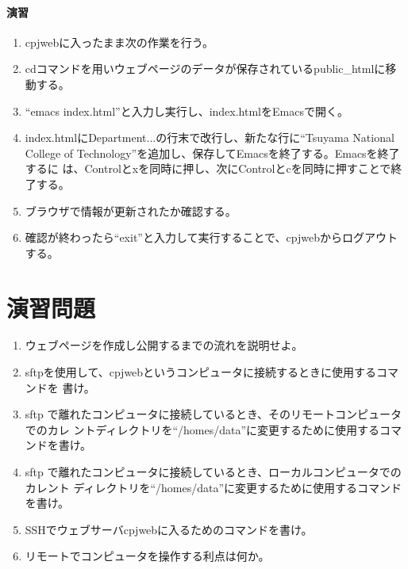 \paragraph{演習}
\begin{enumerate}
\item cpjwebに入ったまま次の作業を行う。
\item cdコマンドを用いウェブページのデータが保存されているpublic\_htmlに移動する。
\item ``emacs index.html''と入力し実行し、index.htmlをEmacsで開く。
\item index.htmlにDepartment...の行末で改行し、新たな行に``Tsuyama National
      College of Technology''を追加し、保存してEmacsを終了する。Emacsを終了するに
      は、Controlとxを同時に押し、次にControlとcを同時に押すことで終了する。
\item ブラウザで情報が更新されたか確認する。
\item 確認が終わったら``exit''と入力して実行することで、cpjwebからログアウトする。
\end{enumerate}


\section{演習問題}

\begin{enumerate}

\item ウェブページを作成し公開するまでの流れを説明せよ。

\item sftpを使用して、cpjwebというコンピュータに接続するときに使用するコマンドを
      書け。

\item sftp で離れたコンピュータに接続しているとき、そのリモートコンピュータでのカレ
      ントディレクトリを``/homes/data''に変更するために使用するコマンドを書け。

\item sftp で離れたコンピュータに接続しているとき、ローカルコンピュータでのカレント
      ディレクトリを``/homes/data''に変更するために使用するコマンドを書け。

\item SSHでウェブサーバcpjwebに入るためのコマンドを書け。

\item リモートでコンピュータを操作する利点は何か。

\end{enumerate}
